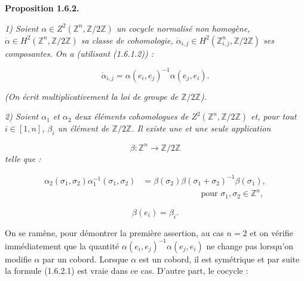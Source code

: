 %
\noindent\textbf{Proposition 1.6.2.}\quad

\noindent\emph{1) Soient
$\alpha\in Z^2(\mathbb Z^n,\mathbb Z/2\mathbb Z)$ un cocycle normalisé
non homogène, $\dot\alpha\in H^2(\mathbb Z^n,\mathbb Z/2\mathbb Z)$
sa classe de cohomologie,
$\dot\alpha_{i,j}\in H^2(\mathbb Z^n_{i,j},\mathbb Z/2\mathbb Z)$
ses composantes. On a (utilisant (1.6.1.2)) :}

\begin{equation}
  \dot\alpha_{i,j}
  =\alpha(e_i,e_j)^{-1}\alpha(e_j,e_i).
  \tag{1.6.2.1}
\end{equation}

\noindent\emph{(On écrit multiplicativement la loi de groupe de
$\mathbb Z/2\mathbb Z$).}

\noindent\emph{2) Soient $\alpha_1$ et $\alpha_2$ deux éléments
cohomologues de $Z^2(\mathbb Z^n,\mathbb Z/2\mathbb Z)$ et, pour tout
$i\in[1,n]$, $\beta_i$ un élément de $\mathbb Z/2\mathbb Z$. Il existe
une et une seule application}

\begin{equation*}
  \beta\colon\mathbb Z^n\longrightarrow\mathbb Z/2\mathbb Z
\end{equation*}
\noindent\emph{telle que :}

\begin{equation}
  \begin{aligned}
    \alpha_2(\sigma_1,\sigma_2)\alpha_1^{-1}(\sigma_1,\sigma_2)
      &=\beta(\sigma_2)\beta(\sigma_1+\sigma_2)^{-1}\beta(\sigma_1),\\[-1mm]
    &\hspace{7em}\text{pour }\sigma_1,\sigma_2\in\mathbb Z^n,
  \end{aligned}
  \tag{1.6.2.2}
\end{equation}

\begin{equation}
  \beta(e_i)=\beta_i.
  \tag{1.6.2.3}
\end{equation}

On se ramène, pour démontrer la première assertion, au cas $n=2$ et
on vérifie immédiatement que la quantité
$\alpha(e_i,e_j)^{-1}\alpha(e_j,e_i)$ ne change pas lorsqu'on modifie
$\alpha$ par un cobord. Lorsque $\alpha$ est un cobord, il est
symétrique et par suite la formule (1.6.2.1) est vraie dans ce cas.
D'autre part, le cocycle :

